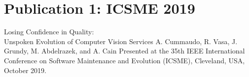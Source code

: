 \chapter{Publication 1: ICSME 2019}

{Losing Confidence in Quality:\\Unspoken Evolution of Computer Vision Services}
{A. Cummaudo, R. Vasa, J. Grundy, M. Abdelrazek, and A. Cain}
{Presented at the 35th IEEE International Conference on Software Maintenance and Evolution (ICSME), Cleveland, USA, October 2019.}
